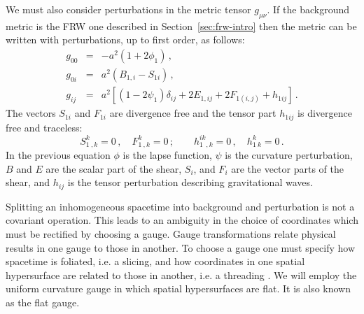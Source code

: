 We must also consider perturbations in the metric tensor $g_{\mu\nu}$. If the
background metric is the FRW one described in Section~\ref{sec:frw-intro} then
the metric can be written with perturbations, up to first order, as follows:
% 
\begin{eqnarray}
 \label{eq:pertmetric-intro}
 g_{00} &=& -a^2 (1 + 2\phi_1) \,,\\
 g_{0i} &=& a^2 (B_{1,i} - S_{1i}) \,,\\
 g_{ij} &=& a^2\left[ (1 - 2\psi_1)\delta_{ij} + 2E_{1,ij} + 2F_{1(i,j)} +
h_{1ij}
\right] \,.
\end{eqnarray}
% 
The vectors $S_{1i}$ and $F_{1i}$ are divergence free and the tensor part
$h_{1ij}$
is divergence free and traceless:
% 
\begin{equation}
 S^k_{1~,k} = 0\,, \quad F^k_{1~,k}=0\,; \qquad h^{ik}_{1~~,k} = 0\,,
  \quad h^k_{1~k}= 0\,.
\end{equation}
% 
In the previous equation $\phi$ is the lapse function, $\psi$ is the curvature
perturbation, $B$ and $E$ are the scalar part of the shear, $S_i$, and $F_i$
are the vector parts of the shear, and $h_{ij}$ is the tensor perturbation
describing gravitational waves.


Splitting an inhomogeneous spacetime into background and perturbation is not a
covariant operation. This leads to an ambiguity in the choice of coordinates
which must be rectified by choosing a gauge. Gauge transformations relate
physical results in one gauge to those in another. To choose a gauge one must
specify how spacetime is foliated, i.e. a slicing, and how coordinates in one
spatial hypersurface are related to those in another, i.e. a threading
\cite{Malik:2008im}. We will
employ the uniform curvature gauge in which spatial hypersurfaces are flat. It
is also known as the flat gauge.

